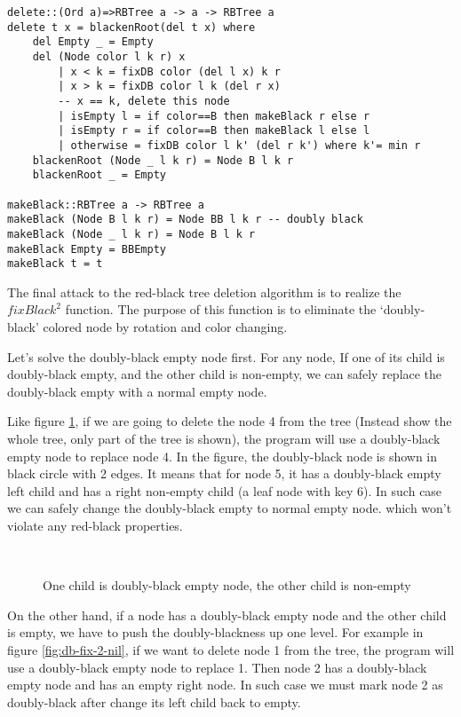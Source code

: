\documentclass{article}
\begin{document}
\begin{lstlisting}
delete::(Ord a)=>RBTree a -> a -> RBTree a
delete t x = blackenRoot(del t x) where
    del Empty _ = Empty
    del (Node color l k r) x
        | x < k = fixDB color (del l x) k r
        | x > k = fixDB color l k (del r x)
        -- x == k, delete this node
        | isEmpty l = if color==B then makeBlack r else r
        | isEmpty r = if color==B then makeBlack l else l
        | otherwise = fixDB color l k' (del r k') where k'= min r
    blackenRoot (Node _ l k r) = Node B l k r
    blackenRoot _ = Empty

makeBlack::RBTree a -> RBTree a
makeBlack (Node B l k r) = Node BB l k r -- doubly black
makeBlack (Node _ l k r) = Node B l k r
makeBlack Empty = BBEmpty
makeBlack t = t
\end{lstlisting}

The final attack to the red-black tree deletion algorithm is to
realize the $fixBlack^2$ function. The purpose of this function
is to eliminate the `doubly-black' colored node by rotation and
color changing.

Let's solve the doubly-black empty node first. For any node,
If one of its child is doubly-black empty, and the other child is
non-empty, we can safely replace the doubly-black empty with a
normal empty node.

Like figure \ref{fig:db-fix-1-nil}, if we
are going to delete the node 4 from the tree (Instead show the whole tree,
only part of the tree is shown), the program will use a doubly-black empty node
to replace node 4. In the figure, the doubly-black node is shown in black
circle with 2 edges. It means that for node 5, it has a doubly-black empty
left child and has a right non-empty child (a leaf node with key 6). In
such case we can safely change the doubly-black empty to normal empty node.
which won't violate any red-black properties.

\begin{figure}[htbp]
   \centering
    \\
   \caption{One child is doubly-black empty node, the other child is non-empty} \label{fig:db-fix-1-nil}
\end{figure}

On the other hand, if a node has a doubly-black empty node and the other child is
empty, we have to push the doubly-blackness up one level. For example in figure
\ref{fig:db-fix-2-nil}, if we want
to delete node 1 from the tree, the program will use a doubly-black empty node
to replace 1. Then node 2 has a doubly-black empty node and has an empty right
node. In such case we must mark node 2 as doubly-black after change its
left child back to empty.
\end{document}
